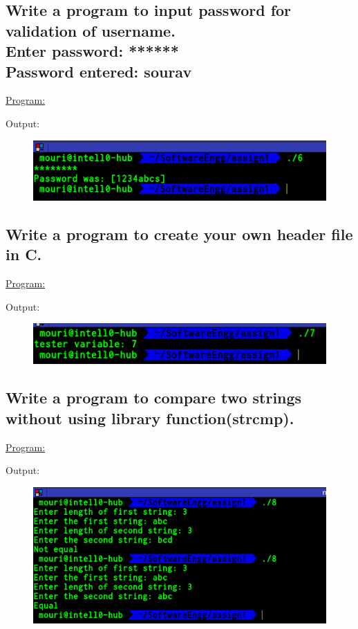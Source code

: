 \documentclass[a4paper,11pt]{article}
\begin{document}
\subsection{Write a program to input password for validation of username.\\
Enter password: ******\\
Password entered: sourav}
\underline{Program:}

Output:
\begin{figure}[H]
\centering
\includegraphics[width=350pt,height=\textheight,keepaspectratio]{./pics/C/6.png}
\end{figure}
\bigskip

\subsection{Write a program to create your own header file in C.}
\underline{Program:}



Output:
\begin{figure}[H]
\centering
\includegraphics[width=350pt,height=\textheight,keepaspectratio]{./pics/C/7.png}
\end{figure}
\bigskip


\subsection{Write a program to compare two strings without using library function(strcmp).}
\underline{Program:}

Output:
\begin{figure}[H]
\centering
\includegraphics[width=350pt,height=\textheight,keepaspectratio]{./pics/C/8.png}
\end{figure}
\bigskip
\end{document}
